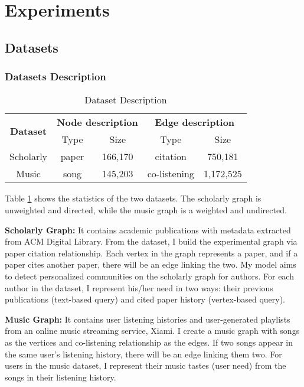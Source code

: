 \section{Experiments}

\subsection{Datasets} 
\subsubsection{Datasets Description} 

 
\begin{table}[h]
	\centering
	
	\begin{tabular}{|c|c|c|c|c|} 
		\hline
		\multirow{2}{*}{\textbf{Dataset}}  &\multicolumn{2}{c|}{\textbf{Node description }} & \multicolumn{2}{c|}{\textbf{Edge description}}\\ \cline{2-5}%
		& Type & Size & Type & Size \\ \hline
		Scholarly & paper & 166,170 & citation &750,181\\ \hline
		Music & song & 145,203 & co-listening &1,172,525
		\\ \hline
	\end{tabular}
	\caption{Dataset Description}
	\label{tab:c3_dataset}
\end{table} 

Table \ref{tab:c3_dataset} shows the statistics of the two datasets.  The scholarly graph is unweighted and directed, while the music graph is a weighted and undirected.

\textbf{Scholarly Graph:} It contains academic publications with metadata extracted from ACM Digital Library. From the dataset, I build the experimental graph via paper citation relationship. Each vertex in the graph represents a paper, and if a paper cites another paper, there will be an edge linking the two. My model aims to detect personalized communities on the scholarly graph for authors. For each author in the dataset, I represent his/her need in two ways: their previous publications (text-based query) and cited paper history (vertex-based query).  

\textbf{Music Graph:} It contains user listening histories and user-generated playlists from an online music streaming service, Xiami. I create a music graph with songs as the vertices and co-listening relationship as the edges. If two songs appear in the same user's listening history, there will be an edge linking them two. For users in the music dataset, I represent their music tastes (user need) from the songs in their listening history.  


